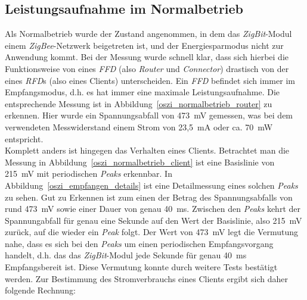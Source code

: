 \subsection{Leistungsaufnahme im Normalbetrieb}\label{leistungsaufnahme_normalbetrieb}

Als Normalbetrieb wurde der Zustand angenommen, in dem das \emph{ZigBit}-Modul einem \emph{ZigBee}-Netzwerk beigetreten
ist, und der Energiesparmodus nicht zur Anwendung kommt. Bei der Messung wurde schnell klar, dass sich hierbei die
Funktionsweise von eines \emph{FFD} (also \emph{Router} und \emph{Connector}) drastisch von der eines \emph{RFD}s (also 
eines Clients) 
unterscheiden. Ein \emph{FFD} befindet sich immer im Empfangsmodus, d.h. es hat immer eine maximale Leistungsaufnahme. 
Die entsprechende Messung ist in Abbildung~\ref{oszi_normalbetrieb_router} zu erkennen. Hier wurde ein Spannungsabfall
von 473~mV gemessen, was bei dem verwendeten Messwiderstand einem Strom von 23,5~mA oder ca. 70~mW entspricht.\\
Komplett anders ist hingegen das Verhalten eines Clients. Betrachtet man die Messung in
Abbildung~\ref{oszi_normalbetrieb_client} ist eine Basislinie von 215~mV mit periodischen \emph{Peaks} erkennbar. 
In Abbildung~\ref{oszi_empfangen_details} ist eine Detailmessung eines solchen \emph{Peaks} zu sehen.  Gut zu Erkennen ist zum 
einen der Betrag des Spannungsabfalls von rund 473~mV sowie einer Dauer von genau 40~ms. Zwischen den \emph{Peaks} kehrt der 
Spannungabfall für genau eine Sekunde auf den Wert der Basislinie, also 215~mV zurück, auf die wieder ein \emph{Peak} folgt.
Der Wert von 473~mV legt die Vermutung nahe, dass es sich bei den \emph{Peaks} um einen periodischen Empfangsvorgang handelt,
d.h. das das \emph{ZigBit}-Modul jede Sekunde für genau 40~ms Empfangsbereit ist. Diese Vermutung konnte durch weitere
Tests bestätigt werden. Zur Bestimmung des Stromverbrauchs eines Clients ergibt sich daher folgende Rechnung:

